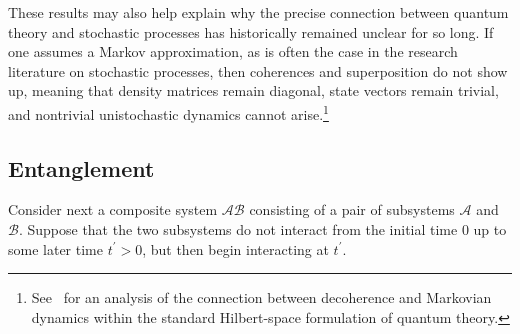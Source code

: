 \documentclass[12pt,english,prl,superscriptaddress,nobibnotes,nofootinbib]{revtex4-2}
\begin{document}
These results may also help explain why the precise connection between
quantum theory and stochastic processes has historically remained
unclear for so long. If one assumes a Markov approximation, as is
often the case in the research literature on stochastic processes,
then coherences and superposition do not show up, meaning that density
matrices remain diagonal, state vectors remain trivial, and nontrivial
unistochastic dynamics cannot arise.\footnote{See~\citep{GlickAdami:2020manmqm} for an analysis of the connection
between decoherence and Markovian dynamics within the standard Hilbert-space
formulation of quantum theory.}

\subsection{Entanglement\label{subsec:Entanglement}}

Consider next a composite system $\mathcal{A}\mathcal{B}$ consisting
of a pair of subsystems $\mathcal{A}$ and $\mathcal{B}$. Suppose
that the two subsystems do not interact from the initial time $0$
up to some later time $t^{\prime}>0$, but then begin interacting
at $t^{\prime}$. 
\end{document}
